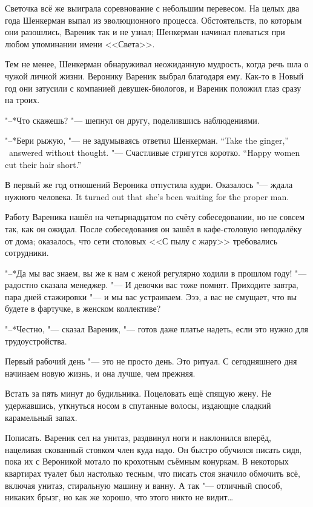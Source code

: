 Светочка всё же выиграла соревнование с небольшим перевесом.
На целых два года Шенкерман выпал из эволюционного процесса.
Обстоятельств, по которым они разошлись, Вареник так и не узнал;
Шенкерман начинал плеваться при любом упоминании имени <<Света>>.

Тем не менее, Шенкерман обнаруживал неожиданную мудрость, когда речь шла о чужой личной жизни.
Веронику Вареник выбрал благодаря ему.
Как-то в Новый год они затусили с компанией девушек-биологов, и Вареник положил глаз сразу на троих.

"--*Что скажешь? "--- шепнул он другу, поделившись наблюдениями.

{"--*Бери рыжую, "--- не задумываясь ответил Шенкерман.}
{``Take the ginger,'' \Shenkerman\  answered without thought.}
{"--- Счастливые стригутся коротко.}
{``Happy women cut their hair short.''}

В первый же год отношений Вероника отпустила кудри.
{Оказалось "--- ждала нужного человека.}
{It turned out that she's been waiting for the proper man.}

\asterism

\label{Tue_2012_04_24}

Работу Вареника нашёл на четырнадцатом по счёту собеседовании, но не совсем так, как он ожидал.
После собеседования он зашёл в кафе-столовую неподалёку от дома;
оказалось, что сети столовых <<С пылу с жару>> требовались сотрудники.

"--*Да мы вас знаем, вы же к нам с женой регулярно ходили в прошлом году! "--- радостно сказала менеджер.
"--- И девочки вас тоже помнят.
Приходите завтра, пара дней стажировки "--- и мы вас устраиваем.
Эээ, а вас не смущает, что вы будете в фартучке, в женском коллективе?

"--*Честно, "--- сказал Вареник, "--- готов даже платье надеть, если это нужно для трудоустройства.

\asterism

\label{Wed_2012_04_25}

Первый рабочий день "--- это не просто день.
Это ритуал.
С сегодняшнего дня начинаем новую жизнь, и она лучше, чем прежняя.

Встать за пять минут до будильника.
Поцеловать ещё спящую жену.
Не удержавшись, уткнуться носом в спутанные волосы, издающие сладкий карамельный запах.

Пописать.
Вареник сел на унитаз, раздвинул ноги и наклонился вперёд, нацеливая скованный стояком член куда надо.
Он быстро обучился писать сидя, пока их с Вероникой мотало по крохотным съёмным конуркам.
В некоторых квартирах туалет был настолько тесным, что писать стоя значило обмочить всё, включая унитаз, стиральную машину и ванну.
А так "--- отличный способ, никаких брызг, но как же хорошо, что этого никто не видит\ldots{}


